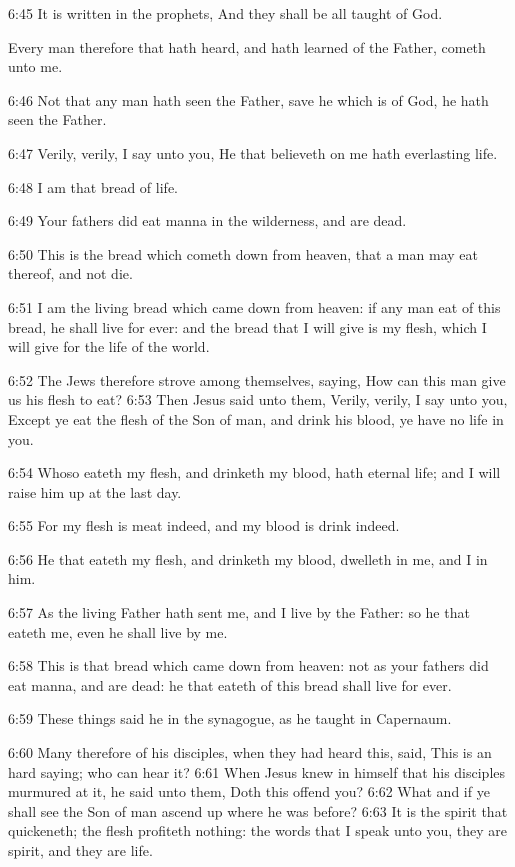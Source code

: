 6:45 It is written in the prophets, And they shall be all taught of God.

Every man therefore that hath heard, and hath learned of the Father, cometh unto me.

6:46 Not that any man hath seen the Father, save he which is of God, he hath seen the Father.

6:47 Verily, verily, I say unto you, He that believeth on me hath everlasting life.

6:48 I am that bread of life.

6:49 Your fathers did eat manna in the wilderness, and are dead.

6:50 This is the bread which cometh down from heaven, that a man may eat thereof, and not die.

6:51 I am the living bread which came down from heaven: if any man eat of this bread, he shall live for ever: and the bread that I will give is my flesh, which I will give for the life of the world.

6:52 The Jews therefore strove among themselves, saying, How can this man give us his flesh to eat?  6:53 Then Jesus said unto them, Verily, verily, I say unto you, Except ye eat the flesh of the Son of man, and drink his blood, ye have no life in you.

6:54 Whoso eateth my flesh, and drinketh my blood, hath eternal life; and I will raise him up at the last day.

6:55 For my flesh is meat indeed, and my blood is drink indeed.

6:56 He that eateth my flesh, and drinketh my blood, dwelleth in me, and I in him.

6:57 As the living Father hath sent me, and I live by the Father: so he that eateth me, even he shall live by me.

6:58 This is that bread which came down from heaven: not as your fathers did eat manna, and are dead: he that eateth of this bread shall live for ever.

6:59 These things said he in the synagogue, as he taught in Capernaum.

6:60 Many therefore of his disciples, when they had heard this, said, This is an hard saying; who can hear it?  6:61 When Jesus knew in himself that his disciples murmured at it, he said unto them, Doth this offend you?  6:62 What and if ye shall see the Son of man ascend up where he was before?  6:63 It is the spirit that quickeneth; the flesh profiteth nothing: the words that I speak unto you, they are spirit, and they are life.

